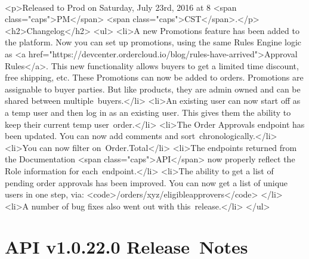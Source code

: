 \documentclass{memoir}%
\begin{document}
\paragraph*{}%
<p>Released to Prod on Saturday, July 23rd, 2016 at 8 <span class="caps">PM</span> <span class="caps">CST</span>.</p>\newline%
<h2>Changelog</h2>\newline%
<ul>\newline%
<li>A new Promotions feature has been added to the platform. Now you can set up promotions, using the same Rules Engine logic as <a href="https://devcenter.ordercloud.io/blog/rules{-}have{-}arrived">Approval Rules</a>. This new functionality allows buyers to get a limited time discount, free shipping, etc. These Promotions can now be added to orders. Promotions are assignable to buyer parties. But like products, they are admin owned and can be shared between multiple~buyers.</li>\newline%
<li>An existing user can now start off as a temp user and then log in as an existing user. This gives them the ability to keep their current temp user~order.</li>\newline%
<li>The Order Approvals endpoint has been updated. You can now add comments and sort~chronologically.</li>\newline%
<li>You can now filter on~Order.Total</li>\newline%
<li>The endpoints returned from the Documentation <span class="caps">API</span> now properly reflect the Role information for each~endpoint.</li>\newline%
<li>The ability to get a list of pending order approvals has been improved. You can now get a list of unique users in one step, via: <code>/orders/xyz/eligibleapprovers</code> </li>\newline%
<li>A number of bug fixes also went out with this~release.</li>\newline%
</ul>

%
\section*{API v1.0.22.0 Release~Notes}%
\paragraph*{}%

%
\end{document}
